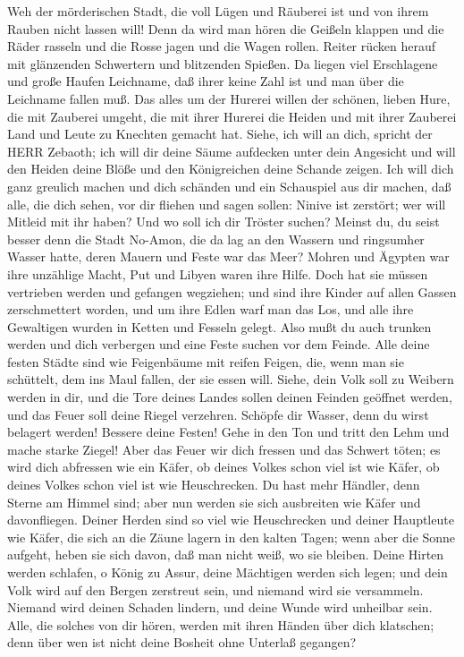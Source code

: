  Weh der mörderischen Stadt, die voll Lügen und Räuberei ist
und von ihrem Rauben nicht lassen will!  Denn da wird man
hören die Geißeln klappen und die Räder rasseln und die Rosse jagen und
die Wagen rollen.  Reiter rücken herauf mit glänzenden
Schwertern und blitzenden Spießen. Da liegen viel Erschlagene und große
Haufen Leichname, daß ihrer keine Zahl ist und man über die Leichname
fallen muß.  Das alles um der Hurerei willen der schönen,
lieben Hure, die mit Zauberei umgeht, die mit ihrer Hurerei die Heiden
und mit ihrer Zauberei Land und Leute zu Knechten gemacht hat.
 Siehe, ich will an dich, spricht der HERR Zebaoth; ich will
dir deine Säume aufdecken unter dein Angesicht und will den Heiden deine
Blöße und den Königreichen deine Schande zeigen.  Ich will
dich ganz greulich machen und dich schänden und ein Schauspiel aus dir
machen,  daß alle, die dich sehen, vor dir fliehen und sagen
sollen: Ninive ist zerstört; wer will Mitleid mit ihr haben? Und wo soll
ich dir Tröster suchen?  Meinst du, du seist besser denn die
Stadt No-Amon, die da lag an den Wassern und ringsumher Wasser hatte,
deren Mauern und Feste war das Meer?  Mohren und Ägypten war
ihre unzählige Macht, Put und Libyen waren ihre Hilfe. 
Doch hat sie müssen vertrieben werden und gefangen wegziehen; und sind
ihre Kinder auf allen Gassen zerschmettert worden, und um ihre Edlen
warf man das Los, und alle ihre Gewaltigen wurden in Ketten und Fesseln
gelegt.  Also mußt du auch trunken werden und dich
verbergen und eine Feste suchen vor dem Feinde.  Alle deine
festen Städte sind wie Feigenbäume mit reifen Feigen, die, wenn man sie
schüttelt, dem ins Maul fallen, der sie essen will.  Siehe,
dein Volk soll zu Weibern werden in dir, und die Tore deines Landes
sollen deinen Feinden geöffnet werden, und das Feuer soll deine Riegel
verzehren.  Schöpfe dir Wasser, denn du wirst belagert
werden! Bessere deine Festen! Gehe in den Ton und tritt den Lehm und
mache starke Ziegel!  Aber das Feuer wir dich fressen und
das Schwert töten; es wird dich abfressen wie ein Käfer, ob deines
Volkes schon viel ist wie Käfer, ob deines Volkes schon viel ist wie
Heuschrecken.  Du hast mehr Händler, denn Sterne am Himmel
sind; aber nun werden sie sich ausbreiten wie Käfer und davonfliegen.
 Deiner Herden sind so viel wie Heuschrecken und deiner
Hauptleute wie Käfer, die sich an die Zäune lagern in den kalten Tagen;
wenn aber die Sonne aufgeht, heben sie sich davon, daß man nicht weiß,
wo sie bleiben.  Deine Hirten werden schlafen, o König zu
Assur, deine Mächtigen werden sich legen; und dein Volk wird auf den
Bergen zerstreut sein, und niemand wird sie versammeln. 
Niemand wird deinen Schaden lindern, und deine Wunde wird unheilbar
sein. Alle, die solches von dir hören, werden mit ihren Händen über dich
klatschen; denn über wen ist nicht deine Bosheit ohne Unterlaß gegangen?
